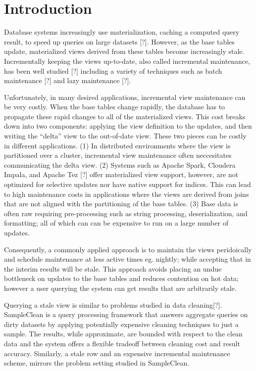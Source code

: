 \section{Introduction}
Database systems increasingly use materialization, caching a computed
query result, to speed up queries on large datasets {[}?{]}. However,
as the base tables update, materialized views derived from these tables
become increasingly stale. Incrementally keeping the views up-to-date,
also called incremental maintenance, has been well studied {[}?{]}
including a variety of techniques such as batch maintenance {[}?{]}
and lazy maintenance {[}?{]}. 

Unfortunately, in many desired applications, incremental view maintenance
can be very costly. 
When the base tables change rapidly, the database has to propagate these rapid changes to
all of the materialized views.  
This cost breaks down into two components: applying
the view definition to the updates, and then writing the ``delta''
view to the out-of-date view. These two pieces can be costly in different
applications. (1) In distributed environments where the view is partitioned
over a cluster, incremental view maintenance often neccesitates communicating
the delta view. (2) Systems such as Apache Spark, Cloudera Impala,
and Apache Tez {[}?{]} offer materialized view support, however, are
not optimized for selective updates nor have native support for indices.
This can lead to high maintenance costs in applications where the
views are derived from joins that are not aligned with the partitioning
of the base tables. (3) Base data is often raw requiring pre-processing
such as string processing, deserialization, and formatting; all of
which can can be expensive to run on a large number of updates. 

Consequently, a commonly applied approach is to maintain the views peridoically and
schedule maintenance at less active times eg. nightly; while accepting
that in the interim results will be stale. This approach avoids placing
an undue bottleneck on updates to the base tables and reduces contention
on hot data; however a user querying the system can get results that
are arbitrarily stale.

Querying a stale view is similar to problems studied in data cleaning{[}?{]}.
SampleClean is a query processing framework that answers aggregate
queries on dirty datasets by applying potentially expensive cleaning
techniques to just a sample. The results, while approximate, are bounded
with respect to the clean data and the system offers a flexible tradeoff
between cleaning cost and result accuracy. Similarly, a stale row
and an expensive incremental maintenance scheme, mirrors the problem
setting studied in SampleClean. 

